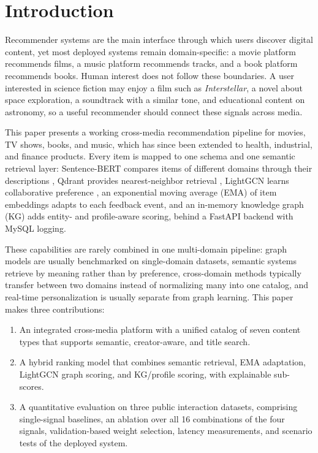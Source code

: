 \documentclass[3p,times,procedia]{elsarticle}
\begin{document}
\section{Introduction}
\label{sec:introduction}
Recommender systems are the main interface through which users discover digital content, yet most deployed systems remain domain-specific: a movie platform recommends films, a music platform recommends tracks, and a book platform recommends books. Human interest does not follow these boundaries. A user interested in science fiction may enjoy a film such as \emph{Interstellar}, a novel about space exploration, a soundtrack with a similar tone, and educational content on astronomy, so a useful recommender should connect these signals across media.

This paper presents a working cross-media recommendation pipeline for movies, TV shows, books, and music, which has since been extended to health, industrial, and finance products. Every item is mapped to one schema and one semantic retrieval layer: Sentence-BERT compares items of different domains through their descriptions \cite{reimers2019sbert}, Qdrant provides nearest-neighbor retrieval \cite{qdrant}, LightGCN learns collaborative preference \cite{he2020lightgcn}, an exponential moving average (EMA) of item embeddings adapts to each feedback event, and an in-memory knowledge graph (KG) adds entity- and profile-aware scoring, behind a FastAPI backend \cite{fastapi} with MySQL logging.

These capabilities are rarely combined in one multi-domain pipeline: graph models are usually benchmarked on single-domain datasets, semantic systems retrieve by meaning rather than by preference, cross-domain methods typically transfer between two domains instead of normalizing many into one catalog, and real-time personalization is usually separate from graph learning. This paper makes three contributions:
\begin{enumerate}
    \item An integrated cross-media platform with a unified catalog of seven content types that supports semantic, creator-aware, and title search.
    \item A hybrid ranking model that combines semantic retrieval, EMA adaptation, LightGCN graph scoring, and KG/profile scoring, with explainable sub-scores.
    \item A quantitative evaluation on three public interaction datasets, comprising single-signal baselines, an ablation over all 16 combinations of the four signals, validation-based weight selection, latency measurements, and scenario tests of the deployed system.
\end{enumerate}
\end{document}
